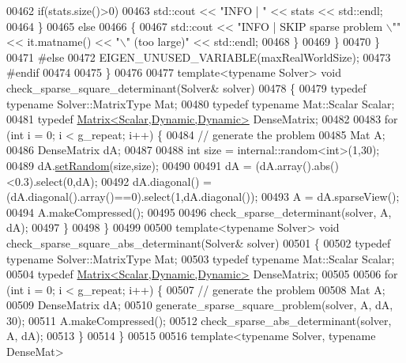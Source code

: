 \begin{DoxyCode}
00462         \textcolor{keywordflow}{if}(stats.size()>0)
00463           std::cout << \textcolor{stringliteral}{"INFO |  "} << stats << std::endl;
00464       \}
00465       \textcolor{keywordflow}{else}
00466       \{
00467         std::cout << \textcolor{stringliteral}{"INFO | SKIP sparse problem \(\backslash\)""} << it.matname() << \textcolor{stringliteral}{"\(\backslash\)" (too large)"} << std::endl;
00468       \}
00469     \}
00470   \}
00471 \textcolor{preprocessor}{#else}
00472   EIGEN\_UNUSED\_VARIABLE(maxRealWorldSize);
00473 \textcolor{preprocessor}{#endif}
00474 
00475 \}
00476 
00477 \textcolor{keyword}{template}<\textcolor{keyword}{typename} Solver> \textcolor{keywordtype}{void} check\_sparse\_square\_determinant(Solver& solver)
00478 \{
00479   \textcolor{keyword}{typedef} \textcolor{keyword}{typename} Solver::MatrixType Mat;
00480   \textcolor{keyword}{typedef} \textcolor{keyword}{typename} Mat::Scalar Scalar;
00481   \textcolor{keyword}{typedef} \hyperlink{group___core___module}{Matrix<Scalar,Dynamic,Dynamic>} DenseMatrix;
00482   
00483   \textcolor{keywordflow}{for} (\textcolor{keywordtype}{int} i = 0; i < g\_repeat; i++) \{
00484     \textcolor{comment}{// generate the problem}
00485     Mat A;
00486     DenseMatrix dA;
00487     
00488     \textcolor{keywordtype}{int} size = internal::random<int>(1,30);
00489     dA.\hyperlink{class_eigen_1_1_plain_object_base_af0e576a0e1aefc9ee346de44cc352ba3}{setRandom}(size,size);
00490     
00491     dA = (dA.array().abs()<0.3).select(0,dA);
00492     dA.diagonal() = (dA.diagonal().array()==0).select(1,dA.diagonal());
00493     A = dA.sparseView();
00494     A.makeCompressed();
00495   
00496     check\_sparse\_determinant(solver, A, dA);
00497   \}
00498 \}
00499 
00500 \textcolor{keyword}{template}<\textcolor{keyword}{typename} Solver> \textcolor{keywordtype}{void} check\_sparse\_square\_abs\_determinant(Solver& solver)
00501 \{
00502   \textcolor{keyword}{typedef} \textcolor{keyword}{typename} Solver::MatrixType Mat;
00503   \textcolor{keyword}{typedef} \textcolor{keyword}{typename} Mat::Scalar Scalar;
00504   \textcolor{keyword}{typedef} \hyperlink{group___core___module}{Matrix<Scalar,Dynamic,Dynamic>} DenseMatrix;
00505 
00506   \textcolor{keywordflow}{for} (\textcolor{keywordtype}{int} i = 0; i < g\_repeat; i++) \{
00507     \textcolor{comment}{// generate the problem}
00508     Mat A;
00509     DenseMatrix dA;
00510     generate\_sparse\_square\_problem(solver, A, dA, 30);
00511     A.makeCompressed();
00512     check\_sparse\_abs\_determinant(solver, A, dA);
00513   \}
00514 \}
00515 
00516 \textcolor{keyword}{template}<\textcolor{keyword}{typename} Solver, \textcolor{keyword}{typename} DenseMat>

\end{DoxyCode}
